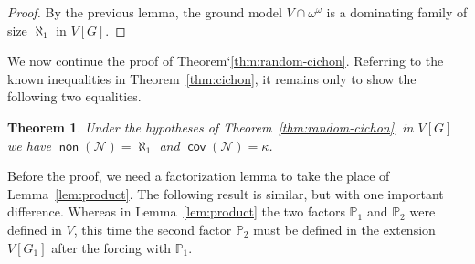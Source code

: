 \documentclass[11pt,oneside]{amsbook}
\newcommand{\PP}{\mathbb P}
\newcommand{\Null}{\mathcal N}
\DeclareMathOperator{\non}{\mathsf{non}}
\DeclareMathOperator{\cov}{\mathsf{cov}}
\theoremstyle{definition}
\theoremstyle{plain}
\newtheorem{thm}{Theorem}[section]
\newtheorem{lem}[thm]{Lemma}
\theoremstyle{definition}
\theoremstyle{remark}
\numberwithin{equation}{section}
\numberwithin{figure}{section}
\begin{document}
\begin{proof}
  By the previous lemma, the ground model $V\cap\omega^\omega$ is a dominating family of size $\aleph_1$ in $V[G]$.
\end{proof}

We now continue the proof of Theorem`\ref{thm:random-cichon}. Referring to the known inequalities in Theorem~\ref{thm:cichon}, it remains only to show the following two equalities.

\begin{thm}
  \label{thm:random-null}
  Under the hypotheses of Theorem~\ref{thm:random-cichon}, in $V[G]$ we have $\non(\Null)=\aleph_1$ and $\cov(\Null)=\kappa$.
\end{thm}





Before the proof, we need a factorization lemma to take the place of Lemma~\ref{lem:product}. The following result is similar, but with one important difference. Whereas in Lemma~\ref{lem:product} the two factors $\PP_1$ and $\PP_2$ were defined in $V$, this time the second factor $\PP_2$ must be defined in the extension $V[G_1]$ after the forcing with $\PP_1$.
\end{document}
